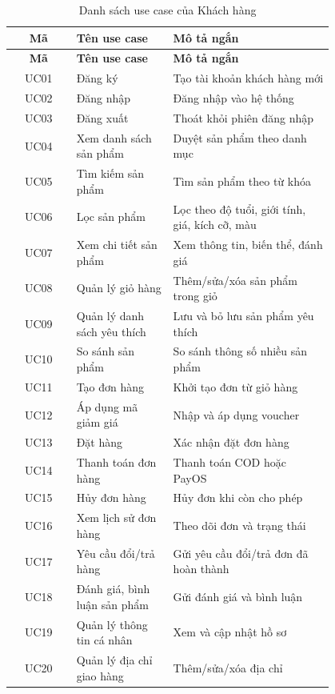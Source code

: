 \begin{longtable}{|c|>{\raggedright\arraybackslash}p{0.30\linewidth}|>{\raggedright\arraybackslash}p{0.50\linewidth}|}
\caption{Danh sách use case của Khách hàng}\label{tab:uc-customer-list}\\
\hline
\rowcolor{gray!12}\textbf{Mã} & \textbf{Tên use case} & \textbf{Mô tả ngắn} \\ \hline
\endfirsthead
\hline
\rowcolor{gray!12}\textbf{Mã} & \textbf{Tên use case} & \textbf{Mô tả ngắn} \\ \hline
\endhead
UC01 & Đăng ký & Tạo tài khoản khách hàng mới \\ \hline
UC02 & Đăng nhập & Đăng nhập vào hệ thống \\ \hline
UC03 & Đăng xuất & Thoát khỏi phiên đăng nhập \\ \hline
UC04 & Xem danh sách sản phẩm & Duyệt sản phẩm theo danh mục \\ \hline
UC05 & Tìm kiếm sản phẩm & Tìm sản phẩm theo từ khóa \\ \hline
UC06 & Lọc sản phẩm & Lọc theo độ tuổi, giới tính, giá, kích cỡ, màu \\ \hline
UC07 & Xem chi tiết sản phẩm & Xem thông tin, biến thể, đánh giá \\ \hline
UC08 & Quản lý giỏ hàng & Thêm/sửa/xóa sản phẩm trong giỏ \\ \hline
UC09 & Quản lý danh sách yêu thích & Lưu và bỏ lưu sản phẩm yêu thích \\ \hline
UC10 & So sánh sản phẩm & So sánh thông số nhiều sản phẩm \\ \hline
UC11 & Tạo đơn hàng & Khởi tạo đơn từ giỏ hàng \\ \hline
UC12 & Áp dụng mã giảm giá & Nhập và áp dụng voucher \\ \hline
UC13 & Đặt hàng & Xác nhận đặt đơn hàng \\ \hline
UC14 & Thanh toán đơn hàng & Thanh toán COD hoặc PayOS \\ \hline
UC15 & Hủy đơn hàng & Hủy đơn khi còn cho phép \\ \hline
UC16 & Xem lịch sử đơn hàng & Theo dõi đơn và trạng thái \\ \hline
UC17 & Yêu cầu đổi/trả hàng & Gửi yêu cầu đổi/trả đơn đã hoàn thành \\ \hline
UC18 & Đánh giá, bình luận sản phẩm & Gửi đánh giá và bình luận \\ \hline
UC19 & Quản lý thông tin cá nhân & Xem và cập nhật hồ sơ \\ \hline
UC20 & Quản lý địa chỉ giao hàng & Thêm/sửa/xóa địa chỉ \\ \hline
\end{longtable}

